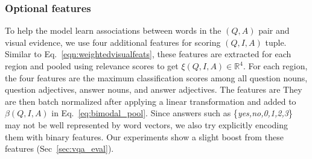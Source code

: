 \documentclass[10pt,twocolumn,letterpaper]{article}
\begin{document}
\subsubsection{Optional features}
To help the model learn associations between words in the $(Q,A)$ pair and visual evidence, we use four additional features for scoring $(Q,I,A)$ tuple. Similar to Eq.~\ref{eqn:weightedvisualfeats}, these features are extracted for each region and pooled using relevance scores to get $\xi(Q,I,A) \in \mathbb{R}^4$. For each region, the four features are the maximum classification scores among all question nouns, question adjectives, answer nouns, and answer adjectives. The features are They are then batch normalized after applying a linear transformation and added to $\beta(Q,I,A)$ in Eq.~\ref{eq:bimodal_pool}. Since answers such as \{\textit{yes,no,0,1,2,3}\} may not be well represented by word vectors, we also try explicitly encoding them with binary features. Our experiments show a slight boost from these features (Sec~\ref{sec:vqa_eval}).
\end{document}
